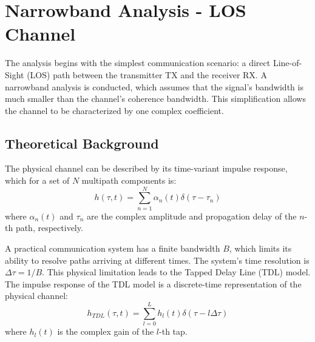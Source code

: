\setcounter{secnumdepth}{3}
\chapter{Narrowband Analysis - LOS Channel}
\label{chap:los}

The analysis begins with the simplest communication scenario: a direct Line-of-Sight (LOS) path between the transmitter TX and the receiver RX. A narrowband analysis is conducted, which assumes that the signal's bandwidth is much smaller than the channel's coherence bandwidth. This simplification allows the channel to be characterized by one complex coefficient.

\section{Theoretical Background}
The physical channel can be described by its time-variant impulse response, which for a set of $N$ multipath components is:
\begin{equation}
	h(\tau,t) = \sum_{n=1}^{N} \alpha_n(t) \delta(\tau - \tau_n)
\end{equation}
where $\alpha_n(t)$ and $\tau_n$ are the complex amplitude and propagation delay of the $n$-th path, respectively.

A practical communication system has a finite bandwidth $B$, which limits its ability to resolve paths arriving at different times. The system's time resolution is $\Delta\tau = 1/B$. This physical limitation leads to the Tapped Delay Line (TDL) model. The impulse response of the TDL model is a discrete-time representation of the physical channel:
\begin{equation}
	h_{TDL}(\tau, t) = \sum_{l=0}^{L} h_l(t) \delta(\tau - l\Delta\tau)
	\label{eq:tdl_model}
\end{equation}
where $h_l(t)$ is the complex gain of the $l$-th tap.

